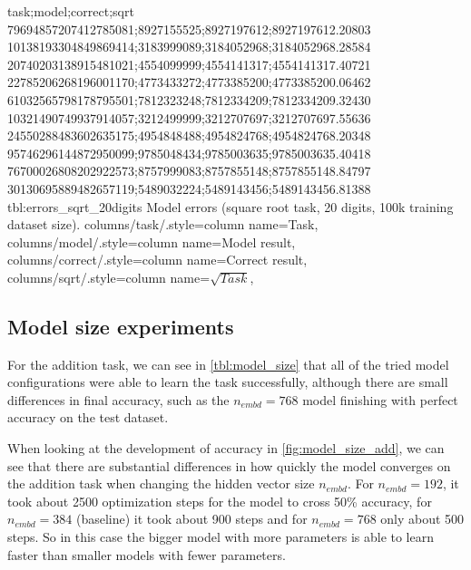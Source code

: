 {
	task;model;correct;sqrt\\
	79694857207412785081;8927155525;8927197612;8927197612.20803\\
	10138193304849869414;3183999089;3184052968;3184052968.28584\\
	20740203138915481021;4554099999;4554141317;4554141317.40721\\
	22785206268196001170;4773433272;4773385200;4773385200.06462\\
	61032565798178795501;7812323248;7812334209;7812334209.32430\\
	10321490749937914057;3212499999;3212707697;3212707697.55636\\
	24550288483602635175;4954848488;4954824768;4954824768.20348\\
	95746296144872950099;9785048434;9785003635;9785003635.40418\\
	76700026808202922573;8757999083;8757855148;8757855148.84797\\
	30130695889482657119;5489032224;5489143456;5489143456.81388\\
}
{tbl:errors_sqrt_20digits}
{
	Model errors (square root task, 20 digits, 100k training dataset size).
}
{
	columns/task/.style={column name={Task}},
	columns/model/.style={column name={Model result}},
	columns/correct/.style={column name={Correct result}},
	columns/sqrt/.style={column name={$\sqrt{Task}$}},
}


\FloatBarrier
\subsection{Model size experiments}
\label{results:modelsize}



For the addition task, we can see in \cref{tbl:model_size} that all of the tried model configurations were able to learn the task successfully, although there are small differences in final accuracy, such as the $n_{embd}=768$ model finishing with perfect accuracy on the test dataset.

When looking at the development of accuracy in \cref{fig:model_size_add}, we can see that there are substantial differences in how quickly the model converges on the addition task when changing the hidden vector size $n_{embd}$. For $n_{embd}=192$, it took about 2500 optimization steps for the model to cross 50\% accuracy, for $n_{embd}=384$ (baseline) it took about 900 steps and for $n_{embd}=768$ only about 500 steps. So in this case the bigger model with more parameters is able to learn faster than smaller models with fewer parameters.

